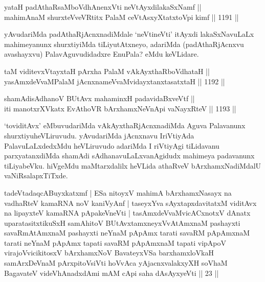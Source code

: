 
\begin{shl}
yataH padAthaRsaMboVdhAnenxVti neVtAyxdilakaSxNamf || \\
mahimAnaM shurxteVveVRtitx PalaM ceVtAsxyXtatxtoV\s pi kimf \hfill || 1191 ||  
\end{shl}

\begin{artha}
yAvudariMda padAthaRjAcnxnadiMdale `neVtineVti' itAyxdi lakaSxNavuLaLx mahimeyanunx shurxtiyiMda tiLiyutAtxneyo, adariMda (padAthaRjAcnxvu avashayxvu) PalavAguvudidadxre EnuPala? eMdu keVLidare.
\end{artha}

\begin{shl}
taM viditevxVtayxtaH pArxha PalaM vAkAyxthaRboVdhataH || \\
yasAmxdeVvaMPalaM jAcnxnameVvaMvidayxtanxtasatxtaH \hfill || 1192 ||  
\end{shl}
				
\begin{shl}
shamAdisAdhanoV BUtAvx mahaminxH padavidaBxveVtf ||  \\
iti manotxrXVkatx EvAthoVR bArxhamxNeVnApi vaNayxRteV \hfill || 1193 ||  
\end{shl}


\begin{artha}
`toviditAvx' eMbuvudariMda vAkAyxthaRjAcnxnadiMda Aguva Palavanunx shurxtiyuheVLiruvudu. yAvudariMda jAcnxnavu IriVtiyAda PalavuLaLxdedxMdu heVLiruvudo adariMda I riVtiyAgi tiLidavanu parxyatanxdiMda shamAdi sAdhanavuLaLxvanAgidudx mahimeya padavanunx tiLiyabeVku. hiVgeMdu maMtarxdalilx heVLida athaRveV bArxhamxNadiMdalU vaNiRsalapxTiTxde.
\end{artha}


\begin {shl}
tadeVtadaqcABuyxkatxmf | ESa nitoyxV mahimA bArxhamxNasayx na vadhaRteV kamaRNA noV kaniVyAnf | taseyxYva sAyxtapxdavitatxM viditAvx na lipayxteV kamaRNA pApakeVneVti | tasAmxdeVvaMvicACxnotxV dAnatx uparatasitxtikuSxH samAhitoV BUtAvxtamxneyxVvAtAmxnaM pashayxti savaRmAtAmxnaM pashayxti neYnaM pApAmx tarati savaRM pApAmxnaM tarati neYnaM pApAmx tapati savaRM pApAmxnaM tapati vipApoV virajoV\s vicikitosxV bArxhamxNoV BavateyxVSa barxhamxloVkaH samArxDeVnaM pArxpitoV\s siVti hoVvAca yAjacnxvalakxyXH soV\s haM BagavateV videVhAnadxdAmi mAM cApi saha dAsAyxyeVti || 23 ||
\end{shl}

